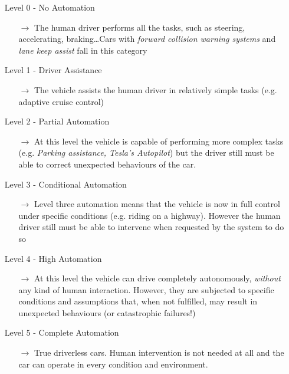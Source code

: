 \begin{itemize}
	\item[Level 0 -] No Automation
	\begin{itemize}
		\item[$\rightarrow$] The human driver performs all the tasks, such as steering, accelerating, braking\dots Cars with \textsl{forward collision warning systems} and \textsl{lane keep assist} fall in this category
	\end{itemize}
	\item[Level 1 -] Driver Assistance
	\begin{itemize}
		\item[$\rightarrow$] The vehicle assists the human driver in relatively simple tasks (e.g. adaptive cruise control)
	\end{itemize}
	\item[Level 2 -] Partial Automation
	\begin{itemize}
		\item[$\rightarrow$] At this level the vehicle is capable of performing more complex tasks (e.g. \textsl{Parking assistance, Tesla's Autopilot}) but the driver still must be able to correct unexpected behaviours of the car.
	\end{itemize}
	\item[Level 3 -] Conditional Automation
	\begin{itemize}
		\item[$\rightarrow$ ] Level three automation means that the vehicle is now in full control under specific conditions (e.g. riding on a highway). However the human driver still must be able to intervene when requested by the system to do so
	\end{itemize}
	\item[Level 4 -] High Automation
	\begin{itemize}
		\item[$\rightarrow$] At this level the vehicle can drive completely autonomously, \textsl{without} any kind of human interaction. However, they are subjected to specific conditions and assumptions that, when not fulfilled, may result in unexpected behaviours (or catastrophic failures!)
	\end{itemize}
	\item[Level 5 -] Complete Automation
	\begin{itemize}
		\item[$\rightarrow$] True driverless cars. Human intervention is not needed at all and the car can operate in every condition and environment.
	\end{itemize}
\end{itemize}



